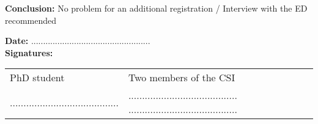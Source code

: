 \documentclass[12pt]{article}
\begin{document}
\noindent\textbf{Conclusion:}
No problem for an additional registration / Interview with the ED
recommended

\bigskip

\noindent\textbf{Date:}
..................................................
\\

\noindent\textbf{Signatures:}

\begin{tabular}{p{5cm}p{12cm}}
  PhD student & Two members of the CSI\\
  ........................................
  &
  ........................................
  ........................................
\end{tabular}
\end{document}
